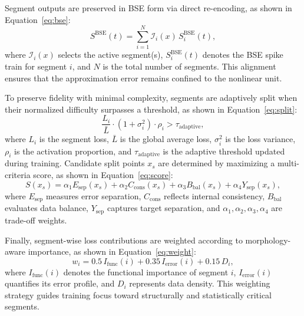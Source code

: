 \documentclass{article}
\theoremstyle{plain}
\theoremstyle{definition}
\theoremstyle{remark}
\begin{document}
Segment outputs are preserved in BSE form via direct re-encoding, as shown in Equation~\ref{eq:bse}:
\begin{equation}
\label{eq:bse}
S^{\mathrm{BSE}}(t) = \sum_{i=1}^{N} \mathcal{I}_i(x)\, S^{\mathrm{BSE}}_i(t),
\end{equation}
where $\mathcal{I}_i(x)$ selects the active segment(s), $S^{\mathrm{BSE}}_i(t)$ denotes the BSE spike train for segment $i$, and $N$ is the total number of segments. This alignment ensures that the approximation error remains confined to the nonlinear unit.

To preserve fidelity with minimal complexity, segments are adaptively split when their normalized difficulty surpasses a threshold, as shown in Equation~\ref{eq:split}:
\begin{equation}
\label{eq:split}
\frac{L_i}{\bar{L}} \cdot (1 + \sigma_i^2) \cdot \rho_i > \tau_{\mathrm{adaptive}},
\end{equation}
where $L_i$ is the segment loss, $\bar{L}$ is the global average loss, $\sigma_i^2$ is the loss variance, $\rho_i$ is the activation proportion, and $\tau_{\mathrm{adaptive}}$ is the adaptive threshold updated during training. Candidate split points $x_s$ are determined by maximizing a multi-criteria score, as shown in Equation~\ref{eq:score}:
\begin{equation}
\label{eq:score}
S(x_s) = \alpha_1 E_{\mathrm{sep}}(x_s) + \alpha_2 C_{\mathrm{cons}}(x_s) + \alpha_3 B_{\mathrm{bal}}(x_s) + \alpha_4 Y_{\mathrm{sep}}(x_s),
\end{equation}
where $E_{\mathrm{sep}}$ measures error separation, $C_{\mathrm{cons}}$ reflects internal consistency, $B_{\mathrm{bal}}$ evaluates data balance, $Y_{\mathrm{sep}}$ captures target separation, and $\alpha_1,\alpha_2,\alpha_3,\alpha_4$ are trade-off weights.  

Finally, segment-wise loss contributions are weighted according to morphology-aware importance, as shown in Equation~\ref{eq:weight}:
\begin{equation}
\label{eq:weight}
w_i = 0.5\, I_{\mathrm{func}}(i) + 0.35\, I_{\mathrm{error}}(i) + 0.15\, D_i,
\end{equation}
where $I_{\mathrm{func}}(i)$ denotes the functional importance of segment $i$, $I_{\mathrm{error}}(i)$ quantifies its error profile, and $D_i$ represents data density. This weighting strategy guides training focus toward structurally and statistically critical segments.
\end{document}
